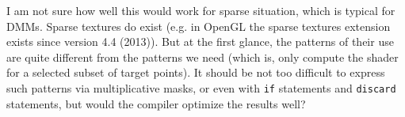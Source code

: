 \documentclass{article}
\begin{document}
\bigskip

I am not sure how well this would work for sparse situation, which is typical for DMMs. Sparse textures do exist (e.g. in OpenGL the sparse textures extension exists since version 4.4 (2013)). But at the first glance, the patterns of their use are quite different from the patterns we need (which is, only compute the shader for a selected subset of target points). It should be
not too difficult to express such patterns via multiplicative masks, or even with {\tt if} statements and {\tt discard} statements, but would the compiler optimize the results well?

\theendnotes

\end{document}
